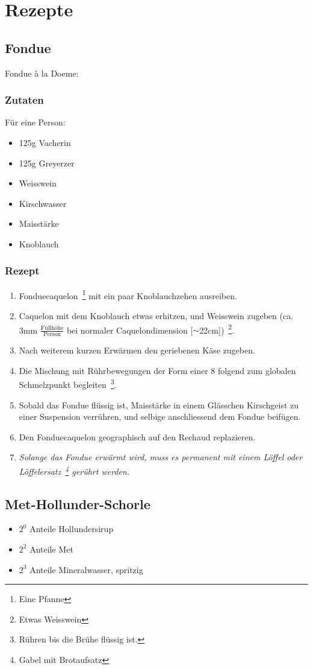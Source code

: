 \section{Rezepte}
\subsection{Fondue}
Fondue à la Doeme:

\subsubsection{Zutaten}
Für eine Person:
\begin{itemize}
\item 125g Vacherin
\item 125g Greyerzer
\item Weisswein
\item Kirschwasser
\item Maisstärke
\item Knoblauch
\end{itemize}
\subsubsection{Rezept}

\begin{enumerate}
\item Fonduecaquelon~\footnote{Eine Pfanne} mit ein paar Knoblauchzehen ausreiben.
\item Caquelon mit dem Knoblauch etwas erhitzen, und Weisswein zugeben (ca. 3mm $\frac {\mbox{Füllhöhe}} {\mbox{Person}}$ bei normaler Caquelondimension [$\sim$22cm])~\footnote{Etwas Weisswein}.
\item Nach weiterem kurzen Erwärmen den geriebenen Käse zugeben.
\item Die Mischung mit Rührbewegungen der Form einer 8 folgend zum globalen Schmelzpunkt begleiten~\footnote{Rühren bis die Brühe flüssig ist.}.
\item Sobald das Fondue flüssig ist, Maisstärke in einem Glässchen Kirschgeist zu einer Suspension verrühren, und selbige anschliessend dem Fondue beifügen.
\item Den Fonduecaquelon geographisch auf den Rechaud replazieren.
\item \emph{Solange das Fondue erwärmt wird, muss es permanent mit einem Löffel oder Löffelersatz~\footnote{Gabel mit Brotaufsatz} gerührt werden.} 
\end{enumerate}

\subsection{Met-Hollunder-Schorle}
\begin{itemize}
\item $2^{0}$ Anteile Hollundersirup
\item $2^{2}$ Anteile Met
\item $2^{3}$ Anteile Mineralwasser, spritzig
\end{itemize}
